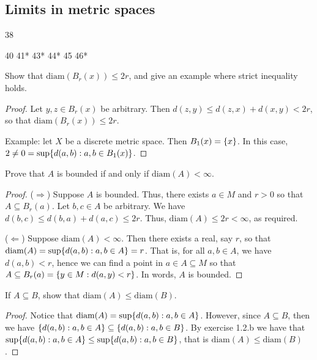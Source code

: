 \subsection{Limits in metric spaces}

38

40
41*
43*
44*
45
46*

\begin{exercise}{27}
Show that $\text{diam}(B_r(x))\leq 2r$, and give an example where strict inequality holds.
\end{exercise}
\begin{proof}
Let $y,z\in B_r(x)$ be arbitrary. Then $d(z,y)\leq d(z,x)+d(x,y)<2r$, so that $\text{diam}(B_r(x))\leq 2r$. 

Example: let $X$ be a discrete metric space. Then $B_1(x)=\{x\}$. In this case, $2\neq 0=\sup\{d(a,b):a,b\in B_1(x)\}$.
\end{proof} 

\begin{exercise}{29}
Prove that $A$ is bounded if and only if $\text{diam}(A)<\infty$.
\end{exercise}
\begin{proof}
($\Rightarrow$) Suppose $A$ is bounded. Thus, there exists $a\in M$ and $r>0$ so that $A\subseteq B_r(a)$. Let $b,c\in A$ be arbitrary. We have $d(b,c)\leq d(b,a)+d(a,c)\leq 2r$. Thus, $\text{diam}(A)\leq 2r<\infty$, as required.

($\Leftarrow$) Suppose $\text{diam}(A)<\infty$. Then there exists a real, say $r$, so that $\text{diam}(A) =\sup\{d(a,b):a,b\in A\} =r$. That is, for all $a,b\in A$, we have $d(a,b)<r$, hence we can find a point in $a\in A\subseteq M$ so that $A\subseteq B_r(a)=\{y\in M:d(a,y)<r\}$. In words, $A$ is bounded.
\end{proof} 

\begin{exercise}{30}
If $A\subseteq B$, show that $\text{diam}(A)\leq\text{diam}(B)$.
\end{exercise}
\begin{proof}
Notice that $\text{diam}(A) =\sup\{d(a,b):a,b\in A\}$. However, since $A\subseteq B$, then we have $\{d(a,b):a,b\in A\} \subseteq\{d(a,b):a,b\in B\}$. By exercise 1.2.b we have that $\sup\{d(a,b):a,b\in A\} \leq\sup\{d(a,b):a,b\in B\}$, that is $\text{diam}(A) \leq\text{diam}(B)$.
\end{proof} 

